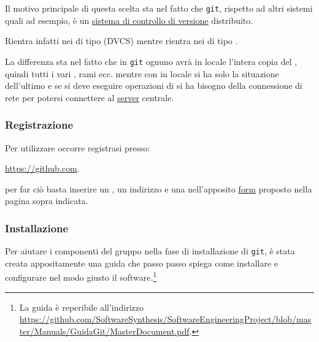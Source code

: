 Il motivo principale di questa scelta sta nel fatto che \texttt{git}, rispetto ad altri sistemi quali  ad esempio, è un \underline{sistema di controllo di versione} distribuito.

Rientra infatti nei  di tipo  (DVCS) mentre  rientra nei  di tipo .

La differenza sta nel fatto che in \texttt{git} ognuno avrà in locale l'intera copia del , quindi tutti i vari , rami ecc. mentre con  in locale si ha solo la situazione dell'ultimo  e se si deve eseguire operazioni di  si ha bisogno della connessione di rete per potersi connettere al \underline{server} centrale.

\subsubsection{Registrazione}
Per utilizzare  occorre registrasi presso:
\begin{center}
\url{https://github.com}.
\end{center}
per far ciò basta inserire un , un indirizzo  e una  nell'apposito \underline{form} proposto nella pagina sopra indicata.

\subsubsection{Installazione}
Per aiutare i componenti del gruppo nella fase di installazione di \texttt{git}, è stata creata appositamente una guida che passo passo spiega come installare e configurare nel modo giusto il software.\footnote{%
La guida è reperibile all'indirizzo 
\url{https://github.com/SoftwareSynthesis/SoftwareEngineeringProject/blob/master/Manuals/GuidaGit/MasterDocument.pdf}.
}

